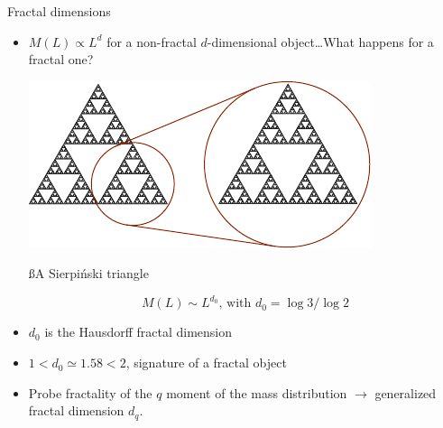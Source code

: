 \begin{frame}{Fractal dimensions}
\begin{itemize}
	\item $M(L) \propto L^d$ for a non-fractal $d$-dimensional object\dots What happens for a fractal one?
	
	{\centering
	\includegraphics[width=.4\textwidth]{img/2_part1/sierpinski}
	
	{\ss A Sierpiński triangle}
	
	}
	
	\[
		M(L) \sim L^{d_0} \text{, with } d_0 = \log 3/\log 2
	\]
	
	\item $d_0$ is the Hausdorff fractal dimension
	\item $1 < d_0 \simeq 1.58 < 2$, signature of a fractal object
	\item Probe fractality of the $q$ moment of the mass distribution $\to$ generalized fractal dimension $d_q$.
\end{itemize}
\end{frame}

